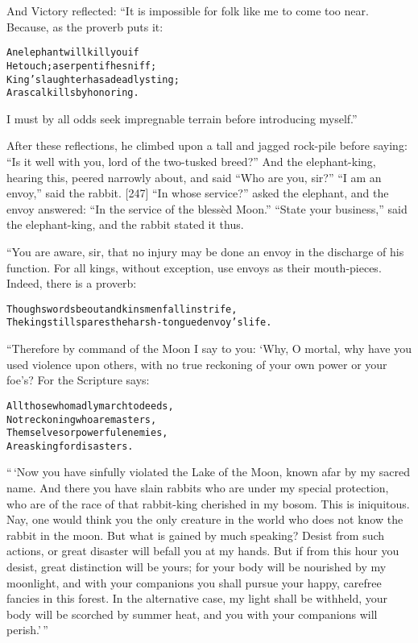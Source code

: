 \documentclass{article}
\renewenvironment{verbatim}{\begin{alltt}\normalfont\begin{centering}}{\end{centering}\end{alltt}}
\begin{document}
And Victory reflected: “It is impossible for folk like me to come
too near. Because, as the proverb puts it:

\begin{verbatim}
An elephant will kill you if
He touch; a serpent if he sniff;
King's laughter has a deadly sting;
A rascal kills by honoring.
\end{verbatim}
I must by all odds seek impregnable terrain before introducing
myself.”

After these reflections, he climbed upon a tall and jagged
rock-pile before saying:
``Is it well with you, lord of the two-tusked breed?'' And the
elephant-king, hearing this, peered narrowly about, and said
``Who are you, sir?'' ``I am an envoy,'' said the rabbit. [247]
``In whose service?'' asked the elephant, and the envoy answered:
``In the service of the blessèd Moon.'' ``State your business,''
said the elephant-king, and the rabbit stated it thus.

“You are aware, sir, that no injury may be done an envoy in the
discharge of his function. For all kings, without exception, use
envoys as their mouth-pieces. Indeed, there is a proverb:

\begin{verbatim}
Though swords be out and kinsmen fall in strife,
The king still spares the harsh-tongued envoy's life.
\end{verbatim}
“Therefore by command of the Moon I say to you: ‘Why, O mortal, why
have you used violence upon others, with no true reckoning of your
own power or your foe's? For the Scripture says:

\begin{verbatim}
All those who madly march to deeds,
Not reckoning who are masters,
Themselves or powerful enemies,
Are asking for disasters.
\end{verbatim}
``\,`Now you have sinfully violated the Lake of the Moon, known afar by my sacred name. And there you have slain rabbits who are under my special protection, who are of the race of that rabbit-king cherished in my bosom. This is iniquitous. Nay, one would think you the only creature in the world who does not know the rabbit in the moon. But what is gained by much speaking? Desist from such actions, or great disaster will befall you at my hands. But if from this hour you desist, great distinction will be yours; for your body will be nourished by my moonlight, and with your companions you shall pursue your happy, carefree fancies in this forest. In the alternative case, my light shall be withheld, your body will be scorched by summer heat, and you with your companions will perish.'\,''
\end{document}
